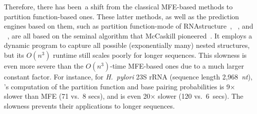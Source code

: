 

Therefore, there has been a shift from the classical MFE-based methods to partition function-based ones.
These latter methods, 
as well as the prediction engines based on them, such as partition function-mode of RNAstructure~\cite{mathews+turner:2006}, 
\viennarnafold~\cite{lorenz+:2011}, 
and \contrafold~\cite{do+:2006},
are all based on the seminal algorithm that McCaskill pioneered~\cite{mccaskill:1990}.
It employs a dynamic program to capture all possible (exponentially many) nested structures,
but its $O(n^3)$ runtime still scales poorly for longer sequences. 
This slowness %
is even more severe than the $O(n^3)$-time MFE-based ones
due to a much larger constant factor.
For instance, for 
{\it H.~pylori} 23S rRNA (sequence length 2,968~{\it nt}),
\viennarnafold's %
computation of the partition function and base pairing probabilities
is 9$\times$ slower than MFE (71 vs.~8 secs),
and \contrafold %
is even 20$\times$ slower (120 vs.~6~secs).
The slowness %
prevents their applications to longer sequences.


